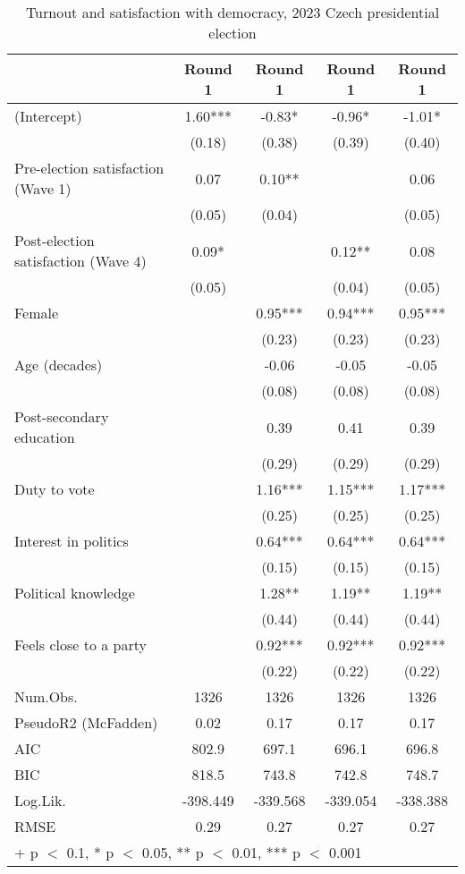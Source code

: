 \begin{table}

\caption{\label{tab:unnamed-chunk-2}Turnout and satisfaction with democracy, 2023 Czech presidential election}
\centering
\begin{tabular}[t]{lcccc}
\toprule
  & Round 1 & Round 1  & Round 1   & Round 1   \\
\midrule
(Intercept) & 1.60*** & -0.83* & -0.96* & -1.01*\\
 & (0.18) & (0.38) & (0.39) & (0.40)\\
Pre-election satisfaction (Wave 1) & 0.07 & 0.10** &  & 0.06\\
 & (0.05) & (0.04) &  & (0.05)\\
Post-election satisfaction (Wave 4) & 0.09* &  & 0.12** & 0.08\\
 & (0.05) &  & (0.04) & (0.05)\\
Female &  & 0.95*** & 0.94*** & 0.95***\\
 &  & (0.23) & (0.23) & (0.23)\\
Age (decades) &  & -0.06 & -0.05 & -0.05\\
 &  & (0.08) & (0.08) & (0.08)\\
Post-secondary education &  & 0.39 & 0.41 & 0.39\\
 &  & (0.29) & (0.29) & (0.29)\\
Duty to vote &  & 1.16*** & 1.15*** & 1.17***\\
 &  & (0.25) & (0.25) & (0.25)\\
Interest in politics &  & 0.64*** & 0.64*** & 0.64***\\
 &  & (0.15) & (0.15) & (0.15)\\
Political knowledge &  & 1.28** & 1.19** & 1.19**\\
 &  & (0.44) & (0.44) & (0.44)\\
Feels close to a party &  & 0.92*** & 0.92*** & 0.92***\\
 &  & (0.22) & (0.22) & (0.22)\\
\midrule
Num.Obs. & 1326 & 1326 & 1326 & 1326\\
PseudoR2 (McFadden) & 0.02 & 0.17 & 0.17 & 0.17\\
AIC & 802.9 & 697.1 & 696.1 & 696.8\\
BIC & 818.5 & 743.8 & 742.8 & 748.7\\
Log.Lik. & -398.449 & -339.568 & -339.054 & -338.388\\
RMSE & 0.29 & 0.27 & 0.27 & 0.27\\
\bottomrule
\multicolumn{5}{l}{\rule{0pt}{1em}+ p $<$ 0.1, * p $<$ 0.05, ** p $<$ 0.01, *** p $<$ 0.001}\\
\end{tabular}
\end{table}

